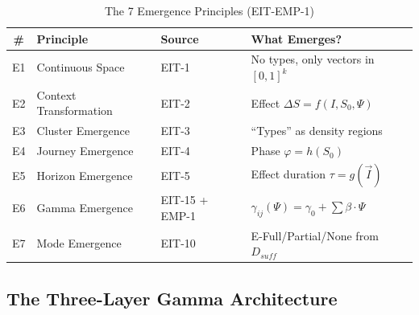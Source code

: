 \begin{table}[htbp]
\centering
\caption{The 7 Emergence Principles (EIT-EMP-1)}
\label{tab:emergence-principles}
\renewcommand{\arraystretch}{1.3}
\begin{tabular}{@{}clll@{}}
\toprule
\textbf{\#} & \textbf{Principle} & \textbf{Source} & \textbf{What Emerges?} \\
\midrule
E1 & Continuous Space & EIT-1 & No types, only vectors in $[0,1]^k$ \\
E2 & Context Transformation & EIT-2 & Effect $\Delta S = f(I, S_0, \Psi)$ \\
E3 & Cluster Emergence & EIT-3 & ``Types'' as density regions \\
E4 & Journey Emergence & EIT-4 & Phase $\varphi = h(S_0)$ \\
E5 & Horizon Emergence & EIT-5 & Effect duration $\tau = g(\vec{I})$ \\
E6 & Gamma Emergence & EIT-15 + EMP-1 & $\gamma_{ij}(\Psi) = \gamma_0 + \sum \beta \cdot \Psi$ \\
E7 & Mode Emergence & EIT-10 & E-Full/Partial/None from $D_{suff}$ \\
\bottomrule
\end{tabular}
\end{table}

\subsection{The Three-Layer Gamma Architecture}
\label{subsec:emp1-architecture}

